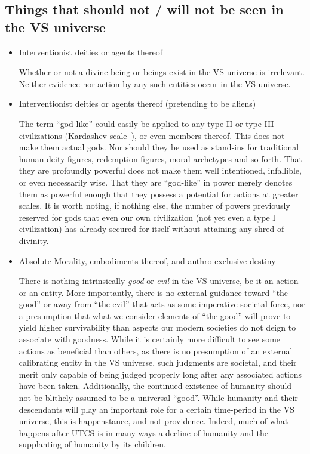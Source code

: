 \subsection{Things that should not / will not be seen in the VS universe}
\label{subsec:thingsnotinVSU}
\begin{itemize}

\item Interventionist deities or agents thereof

Whether or not a divine being or beings exist in the VS universe is
irrelevant. Neither evidence nor action by any such entities occur in
the VS universe.

\item Interventionist deities or agents thereof (pretending to be aliens)

The term ``god-like'' could easily be applied to any type II or type
III civilizations (Kardashev scale~\cite{Kardashev}), or even members
thereof. This does not make them actual gods. Nor should they be used
as stand-ins for traditional human deity-figures, redemption figures,
moral archetypes and so forth. That they are profoundly powerful does
not make them well intentioned, infallible, or even necessarily
wise. That they are ``god-like'' in power merely denotes them as
powerful enough that they possess a potential for actions at greater
scales. It is worth noting, if nothing else, the number of powers
previously reserved for gods that even our own civilization (not yet
even a type I civilization) has already secured for itself without attaining
any shred of divinity.

\item Absolute Morality, embodiments thereof, and anthro-exclusive destiny

There is nothing intrinsically {\em good} or {\em evil} in the VS
universe, be it an action or an entity. More importantly, there is no
external guidance toward ``the good'' or away from ``the evil'' that
acts as some imperative societal force, nor a presumption that what we
consider elements of ``the good'' will prove to yield higher
survivability than aspects our modern societies do not deign to
associate with goodness. While it is certainly more difficult to see
some actions as beneficial than others, as there is no presumption of
an external calibrating entity in the VS universe, such judgments are
societal, and their merit only capable of being judged properly long
after any associated actions have been taken. Additionally, the
continued existence of humanity should not be blithely assumed to be a
universal ``good''. While humanity and their descendants will play an
important role for a certain time-period in the VS universe, this is
happenstance, and not providence. Indeed, much of what happens after
UTCS is in many ways a decline of humanity and the supplanting of
humanity by its children.


\end{itemize}
